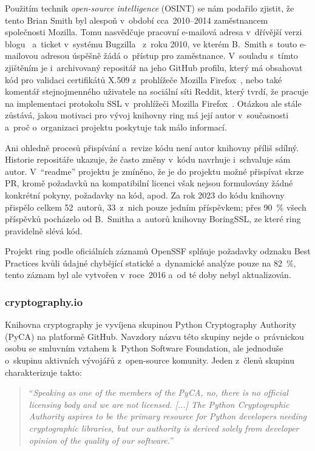 Použitím technik \textit{open-source intelligence} (OSINT) se nám podařilo zjistit, že tento Brian Smith byl alespoň v~období cca~2010--2014 zaměstnancem společnosti Mozilla. Tomu nasvědčuje pracovní e-mailová adresa v~dřívější verzi blogu~\cite{briansmith-email} a~ticket v~systému Bugzilla~\cite{briansmith-bugzilla} z~roku 2010, ve kterém B.~Smith s~touto e-mailovou adresou úspěšně žádá o~přístup pro zaměstnance. V~souladu s~tímto zjištěním je i~archivovaný repositář na jeho GitHub profilu, který má obsahovat kód pro validaci certifikátů X.509 z~prohlížeče Mozilla Firefox~\cite{briansmith-firefox}, nebo také komentář stejnojmenného uživatele na sociální síti Reddit, který tvrdí, že pracuje na implementaci protokolu SSL v~prohlížeči Mozilla Firefox~\cite{briansmith-ssl}. Otázkou ale stále zůstává, jakou motivaci pro vývoj knihovny ring má její autor v~současnosti a~proč o~organizaci projektu poskytuje tak málo informací.

Ani ohledně procesů přispívání a~revize kódu není autor knihovny příliš sdílný. Historie repositáře ukazuje, že často změny v~kódu navrhuje i~schvaluje sám autor. V~``readme'' projektu je zmíněno, že je do projektu možné přispívat skrze PR, kromě požadavků na kompatibilní licenci však nejsou formulovány žádné konkrétní pokyny, požadavky na kód, apod. Za rok 2023 do kódu knihovny přispělo celkem 52~autorů, 33~z~nich pouze jedním příspěvkem; přes 90~\% všech příspěvků pocházelo od B.~Smitha a~autorů knihovny BoringSSL, ze které ring pravidelně slévá kód.

Projekt ring podle oficiálních záznamů OpenSSF splňuje požadavky odznaku Best Practices kvůli údajné chybějící statické a~dynamické analýze pouze na 82~\%, tento záznam byl ale vytvořen v~roce~2016 a~od té doby nebyl aktualizován.

\subsubsection*{cryptography.io}

Knihovna cryptography je vyvíjena skupinou Python Cryptography Authority (PyCA) na platformě GitHub. Navzdory názvu této skupiny nejde o~právnickou osobu se smluvním vztahem k~Python Software Foundation, ale jednoduše o~skupinu aktivních vývojářů z~open-source komunity. Jeden z~členů skupinu charakterizuje takto:

\blockquote{``\textit{Speaking as one of the members of the PyCA, no, there is no official licensing body and we are not licensed. [...] The Python Cryptographic Authority aspires to be the primary resource for Python developers needing cryptographic libraries, but our authority is derived solely from developer opinion of the quality of our software.}''~\cite{pyca-so}}

